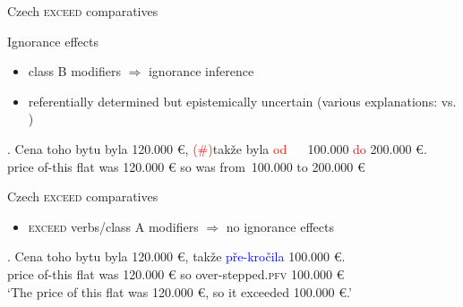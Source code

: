 \documentclass[12pt]{beamer}
\begin{document}
\begin{frame}{Czech \textsc{exceed} comparatives}

Ignorance effects

\begin{itemize}
\item class B modifiers $\Rightarrow$ ignorance inference
\item referentially determined but epistemically uncertain (various explanations: \cite{nouwen2010two} vs. \cite{buring2008least}) 
\end{itemize}
\exg. Cena toho bytu byla 120.000 {\euro,} \textcolor{red}{(\#)}takže byla \textcolor{red}{od }~{ }~100.000 \textcolor{red}{do} {200.000 {\euro}}.\label{ex:classB}\\
price of-this flat was 120.000 {\euro} so was from~100.000 to {200.000 {\euro}}\\

\end{frame}

\begin{frame}{Czech \textsc{exceed} comparatives}

\begin{itemize}
\item \textsc{exceed} verbs/class A modifiers $\Rightarrow$ no ignorance effects
\end{itemize}

\exg. Cena toho bytu byla 120.000 {\euro,} takže \textcolor{blue}{pře-kročila} {100.000 {\euro}}.\label{ex:classA}\\
price of-this flat was 120.000 {\euro} so over-stepped.\textsc{pfv} {100.000 {\euro}}\\
`The price of this flat was 120.000 {\euro}, so it exceeded 100.000 {\euro}.'


\end{frame}
\end{document}
